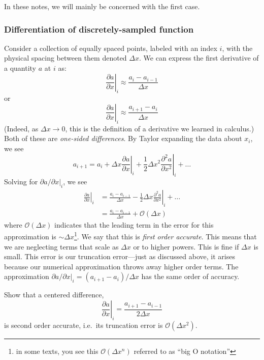  In these notes, we will mainly be concerned with the first case.

\subsubsection{Differentiation of discretely-sampled function}
\label{ch:intro:diff}
Consider a collection of equally spaced points, labeled with an index
$i$, with the physical spacing between them denoted $\Delta
x$.   We can express the first derivative of
a quantity $a$ at $i$ as:
\begin{equation}
\left . \frac{\partial a}{\partial x} \right |_i \approx \frac{a_i - a_{i-1}}{\Delta x}
\end{equation}
or
\begin{equation}
\left . \frac{\partial a}{\partial x} \right |_i \approx \frac{a_{i+1} - a_i}{\Delta x}
\end{equation}
%
(Indeed, as $\Delta x \rightarrow 0$, this is the definition of a
derivative we learned in calculus.)  Both of these are {\em one-sided
  differences}.  By Taylor expanding the data about $x_i$, we see
\begin{equation}
a_{i+1} = a_i + \Delta x \left . \frac{\partial a}{\partial x} \right |_i + \frac{1}{2} \Delta x^2 \left . \frac{\partial^2 a}{\partial x^2} \right |_i + \ldots
\end{equation}
Solving for ${\partial a}/{\partial x} |_i$, we see
\begin{align}
\left . \frac{\partial a}{\partial x} \right |_i &= 
    \frac{a_i - a_{i-1}}{\Delta x} - \frac{1}{2}\Delta x \left . \frac{\partial^2 a}{\partial x^2} \right |_i + \ldots \\ 
%
 &= \frac{a_i - a_{i-1}}{\Delta x} + \mathcal{O}(\Delta x)
\end{align}
where $\mathcal{O}(\Delta x)$ indicates that the leading term in the
error for this approximation is $\sim \Delta x$\footnote{in some
  texts, you see this $\mathcal{O}(\Delta x^n)$ referred to as ``big O
  notation''}.  We say that this is {\em first order accurate}.  This
means that we are neglecting terms that scale as $\Delta x$ or to
higher powers.  This is fine if $\Delta x$ is small.  This error is our
truncation error---just as discussed above, it arises because our
numerical approximation throws away higher order terms.  The
approximation ${\partial a}/{\partial x} |_i = ({a_{i+1} -
  a_i})/{\Delta x}$ has the same order of accuracy.

\begin{exercise}
{Show that a centered difference,
 \begin{equation*}
\left .\frac{\partial a}{\partial x} \right |_i = \frac{a_{i+1} - a_{i-1}}{2 \Delta x}
\end{equation*}
is second order
accurate, i.e.\ its truncation error is $\mathcal{O}(\Delta x^2)$.}
\end{exercise}

